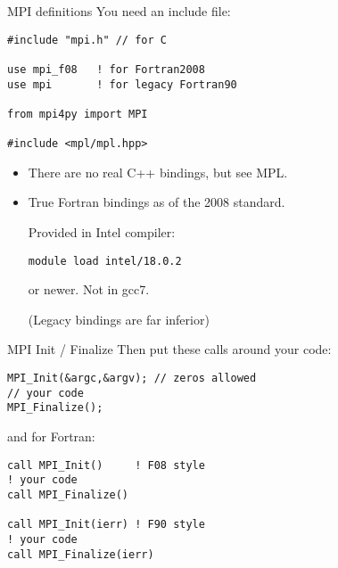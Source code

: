 \begin{numberedframe}{MPI definitions}
\label{sl:mpi-header}
You need an include file:
\begin{verbatim}
#include "mpi.h" // for C

use mpi_f08   ! for Fortran2008
use mpi       ! for legacy Fortran90

from mpi4py import MPI

#include <mpl/mpl.hpp>
\end{verbatim}
\begin{itemize}
\item There are no real C++ bindings, but see MPL.
\item True Fortran bindings as of the 2008 standard.
\begin{tacc}
Provided in Intel compiler:
\begin{verbatim}
module load intel/18.0.2
\end{verbatim}
or newer. Not in gcc7.
\end{tacc}
(Legacy bindings are far inferior)
\end{itemize}
\end{numberedframe}

\begin{numberedframe}{MPI Init / Finalize}
Then put these calls around your code:
\lstset{language=C}
\begin{lstlisting}
MPI_Init(&argc,&argv); // zeros allowed
// your code
MPI_Finalize();
\end{lstlisting}
and for Fortran:
\lstset{language=Fortran}
\begin{lstlisting}
call MPI_Init()     ! F08 style
! your code
call MPI_Finalize()

call MPI_Init(ierr) ! F90 style
! your code
call MPI_Finalize(ierr)
\end{lstlisting}
\end{numberedframe}
